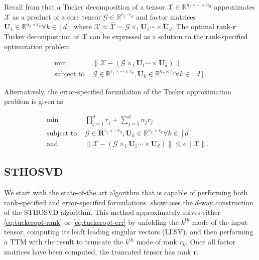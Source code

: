 
Recall from  that a Tucker
decomposition of a tensor $\mathcal{X}\in \mathbb{R}^{n_1\times \cdots \times
n_d}$ approximates $\mathcal{X}$ as a product of a core tensor $\mathcal{G} \in
\mathbb{R}^{r_1 \cdots r_d}$ and factor matrices $\mathbf{U}_k \in
\mathbb{R}^{n_k\times r_k} \forall k \in [d]$ where $\mathcal{X} \approx
\mathcal{\hat{X}} = \mathcal{G} \times_1 \mathbf{U}_1 \cdots \times
\mathbf{U}_d$. The optimal rank-$\mathbf{r}$ Tucker decomposition of
$\mathcal{X}$ can be expressed as a solution to the rank-specified optimization problem

\begin{equation}\label{eq:tuckeropt-rank}
    \begin{aligned}
        \min \quad & \| \mathcal{X} - (\mathcal{G} \times_1 \mathbf{U}_1 \cdots \times \mathbf{U}_d)\| \\ 
        \text{subject to } &\mathcal{G} \in \mathbb{R}^{r_1\times \cdots \times r_d}, \mathbf{U}_{k} \in \mathbb{R}^{n_k\times r_k} \forall k\in [d].
    \end{aligned}
\end{equation}

Alternatively, the error-specified formulation of the Tucker approximation
problem is given as

\begin{equation}\label{eq:tuckeropt-err}
    \begin{aligned}
        \min \quad & \prod_{j=1}^d r_j + \sum_{j=1}^d n_jr_j & \\ 
        \text{subject to } &\mathcal{G} \in \mathbf{R}^{r_1\times \cdots r_d}, \mathbf{U}_{k} \in \mathbb{R}^{n_k\times r_k} \forall k\in [d] \\
        \text{and}\quad  & \| \mathcal{X} - (\mathcal{G} \times_1 \mathbf{U}_1 \cdots \times \mathbf{U}_d) \| \leq \epsilon \|\mathcal{X}\|.
    \end{aligned}
\end{equation}

\subsection{STHOSVD} \label{sec:sthosvd} 

    We start with the state-of-the art algorithm that is capable of performing
    both rank-specified and error-specified formulations. 
    showcases the $d$-way construction of the STHOSVD algorithm. This method
    approximately solves either \cref{eq:tuckeropt-rank} or
    \cref{eq:tuckeropt-err} by unfolding the $k^\text{th}$ mode of the input
    tensor, computing its leaft leading singular vectors (LLSV), and then
    performing a TTM with the result to truncate the $k^\text{th}$ mode of rank
    $r_k$. Once all factor matrices have been computed, the truncated tensor has
    rank $\mathbf{r}$.

